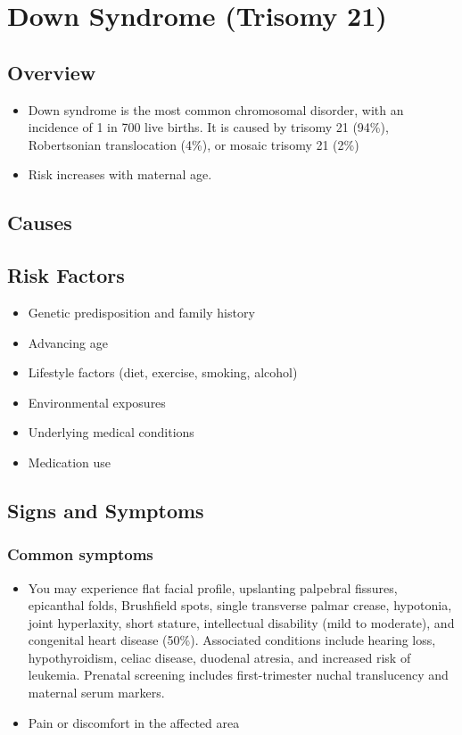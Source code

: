 \chapter{Down Syndrome (Trisomy 21)}
\label{sec:Down Syndrome}

\section{Overview}


\begin{itemize}[noitemsep]
  \item Down syndrome is the most common chromosomal disorder, with an incidence of 1 in 700 live births. It is caused by trisomy 21 (94\%), Robertsonian translocation (4\%), or mosaic trisomy 21 (2\%)
  \item Risk increases with maternal age.
\end{itemize}
\section{Causes}
\section{Risk Factors}

\begin{itemize}[noitemsep]
  \item Genetic predisposition and family history
  \item Advancing age
  \item Lifestyle factors (diet, exercise, smoking, alcohol)
  \item Environmental exposures
  \item Underlying medical conditions
  \item Medication use
\end{itemize}
\section{Signs and Symptoms}

\subsection{Common symptoms}
\begin{itemize}[noitemsep]
  \item You may experience flat facial profile, upslanting palpebral fissures, epicanthal folds, Brushfield spots, single transverse palmar crease, hypotonia, joint hyperlaxity, short stature, intellectual disability (mild to moderate), and congenital heart disease (50\%). Associated conditions include hearing loss, hypothyroidism, celiac disease, duodenal atresia, and increased risk of leukemia. Prenatal screening includes first-trimester nuchal translucency and maternal serum markers.

  \item Pain or discomfort in the affected area
  \end{itemize}

